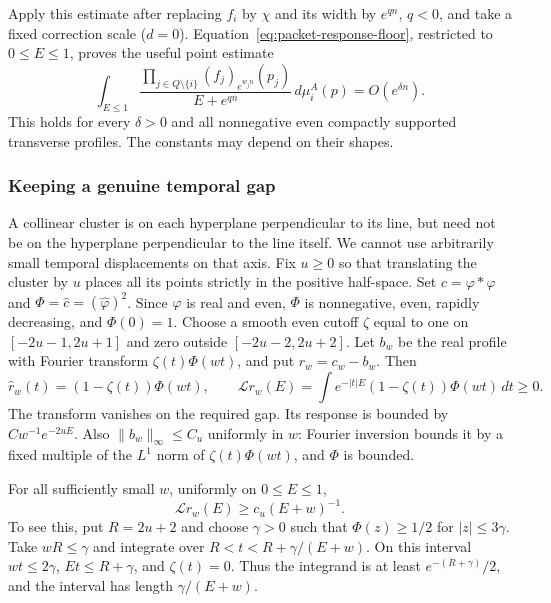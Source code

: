 Apply this estimate after replacing $f_i$ by $\chi$ and its width by
$e^{qn}$, $q<0$, and take a fixed correction scale ($d=0$).
Equation~\eqref{eq:packet-response-floor}, restricted to $0\leq E\leq1$,
proves the useful point estimate
\begin{equation}\label{eq:packet-point-price}
 \int_{E\leq1}\frac{\prod_{j\in Q\setminus\{i\}}
       (f_j)_{e^{w_jn}}(p_j)}{E+e^{qn}}\,d\mu_i^A(p)
       =O(e^{\delta n}).
\end{equation}
This holds for every $\delta>0$ and all nonnegative even compactly
supported transverse profiles. The constants may depend on their shapes.

\subsubsection{Keeping a genuine temporal gap}

A collinear cluster is on each hyperplane perpendicular to its line,
but need not be on the hyperplane perpendicular to the line itself.
We cannot use arbitrarily small temporal displacements on that axis.
Fix $u\geq0$ so that translating the cluster by $u$ places all its points
strictly in the positive half-space. Set $c=\varphi*\varphi$ and
$\Phi=\widehat c=(\widehat\varphi)^2$. Since $\varphi$ is real and
even, $\Phi$ is nonnegative, even, rapidly decreasing, and $\Phi(0)=1$.
Choose a smooth even cutoff $\zeta$ equal to one on $[-2u-1,2u+1]$
and zero outside $[-2u-2,2u+2]$. Let $b_w$ be the real profile with
Fourier transform $\zeta(t)\Phi(wt)$, and put $r_w=c_w-b_w$.
Then
\[
 \widehat r_w(t)=(1-\zeta(t))\Phi(wt),\qquad
 \mathcal Lr_w(E)=\int e^{-|t|E}(1-\zeta(t))\Phi(wt)\,dt\geq0.
\]
The transform vanishes on the required gap. Its response is bounded by
$Cw^{-1}e^{-2uE}$. Also $\|b_w\|_\infty\leq C_u$ uniformly in $w$:
Fourier inversion bounds it by a fixed multiple of the $L^1$ norm of
$\zeta(t)\Phi(wt)$, and $\Phi$ is bounded.

For all sufficiently small $w$, uniformly on $0\leq E\leq1$,
\begin{equation}\label{eq:packet-gap-floor}
 \mathcal Lr_w(E)\geq c_u(E+w)^{-1}.
\end{equation}
To see this, put $R=2u+2$ and choose $\gamma>0$ such that
$\Phi(z)\geq1/2$ for $|z|\leq3\gamma$. Take $wR\leq\gamma$ and
integrate over $R<t<R+\gamma/(E+w)$. On this interval $wt\leq2\gamma$,
$Et\leq R+\gamma$, and $\zeta(t)=0$. Thus the integrand is at least
$e^{-(R+\gamma)}/2$, and the interval has length $\gamma/(E+w)$.

